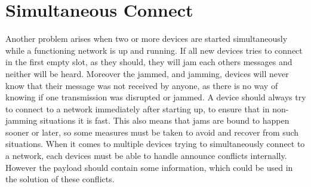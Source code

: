 \clearpage
\section{Simultaneous Connect} %
\label{sec:simultaneous_connect}

Another problem arises when two or more devices are started simultaneously while a functioning network is up and running.
If all new devices tries to connect in the first empty slot, as they should, they will jam each others messages and neither will be heard.
Moreover the jammed, and jamming, devices will never know that their message was not received by anyone, as there is no way of knowing if one transmission was disrupted or jammed.
A device should always try to connect to a network immediately after starting up, to ensure that in non-jamming situations it is fast.
This also means that jams are bound to happen sooner or later, so some measures must be taken to avoid and recover from such situations.
When it comes to multiple devices trying to simultaneously connect to a network, each devices must be able to handle announce conflicts internally.
However the payload should contain some information, which could be used in the solution of these conflicts.

